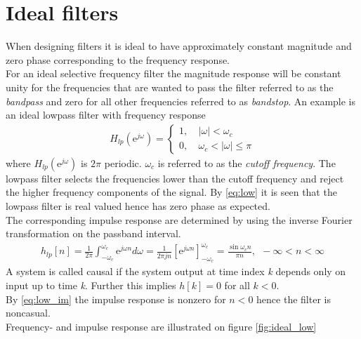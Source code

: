 \section{Ideal filters} 
When designing filters it is ideal to have approximately constant magnitude and zero phase corresponding to the frequency response. \\ For an ideal selective frequency filter the magnitude response will be constant unity for the frequencies that are wanted to pass the filter referred to as the \textit{bandpass} and zero for all other frequencies referred to as \textit{bandstop}. An example is an ideal lowpass filter with frequency response 
\begin{align}\label{eq:low}
H_{lp}(\text{e}^{j\omega})=
\left\{ \begin{matrix}
1, &\ \left| \omega \right|< \omega_c \\
0, &\ \omega_c < \left| \omega \right| \leq \pi
\end{matrix}\right.
\end{align}     
where $H_{lp}(\text{e}^{j\omega})$ is $2\pi$ periodic. $\omega_c$ is referred to as the \textit{cutoff frequency}. The lowpass filter selects the frequencies lower than the cutoff frequency and reject the higher frequency components of the signal. By \eqref{eq:low} it is seen that the lowpass filter is real valued hence has zero phase as expected. \\
The corresponding impulse response are determined by using the inverse Fourier transformation on the passband interval.
\begin{align}\label{eq:low_im}
h_{lp}[n]=\frac{1}{2\pi}\int_{-\omega_c}^{\omega_c}\text{e}^{j\omega n} d\omega = \frac{1}{2\pi j n}\left[\text{e}^{j\omega n} \right]_{-\omega_c}^{\omega_c} = \frac{\sin \omega_c n}{\pi n }, \ \  -\infty < n < \infty
\end{align}  
A system is called causal if the system output at time index \textit{k} depends only on input up to time \textit{k}. Further this implies $h[k] = 0$ for all $k<0$.\cite{FSP,p.196 & 208}  \\
By \eqref{eq:low_im} the impulse response is nonzero for $n<0$ hence the filter is noncasual.\\
Frequency- and impulse response are illustrated on figure \ref{fig:ideal_low}

